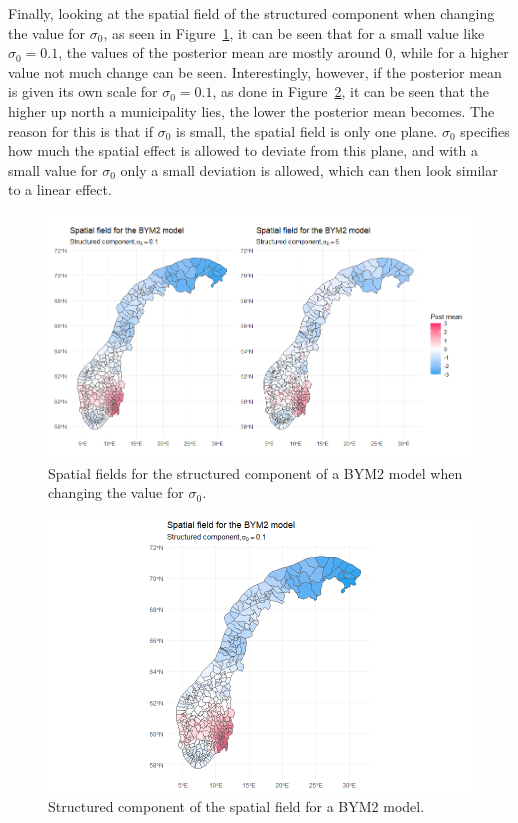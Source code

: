 Finally, looking at the spatial field of the structured component when changing the value for $\sigma_0$, as seen in Figure~\ref{comparison_norway_8}, it can be seen that for a small value like $\sigma_0 = 0.1$, the values of the posterior mean are mostly around 0, while for a higher value not much change can be seen. Interestingly, however, if the posterior mean is given its own scale for $\sigma_0 = 0.1$, as done in Figure~\ref{comparison_norway_9}, it can be seen that the higher up north a municipality lies, the lower the posterior mean becomes. The reason for this is that if $\sigma_0$ is small, the spatial field is only one plane. $\sigma_0$ specifies how much the spatial effect is allowed to deviate from this plane, and with a small value for $\sigma_0$ only a small deviation is allowed, which can then look similar to a linear effect.
\begin{figure}[H]
    \centering
    \includegraphics[width = \textwidth]{spatial_field_norway_3.png}
    \caption{Spatial fields for the structured component of a BYM2 model when changing the value for $\sigma_0$.}
    \label{comparison_norway_8}
\end{figure}
%     
\begin{figure}[H]
    \centering
    \includegraphics[width = \textwidth]{spatial_field_norway_4.png}
    \caption{Structured component of the spatial field for a BYM2 model.}
    \label{comparison_norway_9}
\end{figure}
